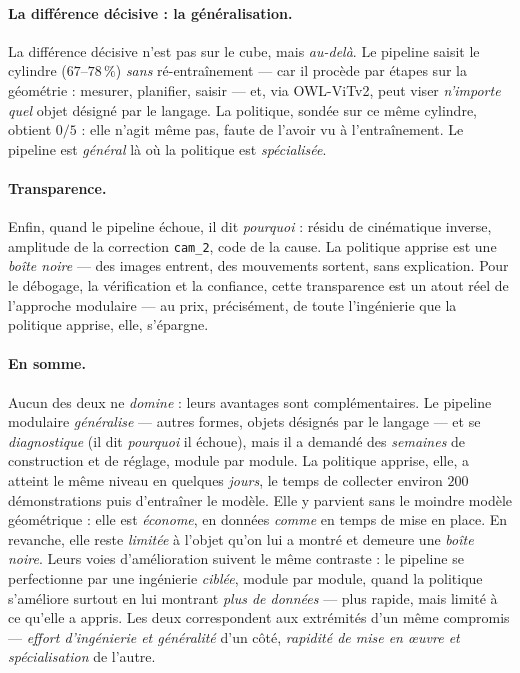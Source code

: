 \paragraph{La différence décisive : la généralisation.} La différence décisive n'est pas sur le cube, mais \emph{au-delà}. Le pipeline saisit le cylindre ($67$--$78\,\%$) \emph{sans} ré-entraînement --- car il procède par étapes sur la géométrie : mesurer, planifier, saisir --- et, via OWL-ViTv2, peut viser \emph{n'importe quel} objet désigné par le langage. La politique, sondée sur ce même cylindre, obtient $0/5$ : elle n'agit même pas, faute de l'avoir vu à l'entraînement. Le pipeline est \emph{général} là où la politique est \emph{spécialisée}.

\paragraph{Transparence.} Enfin, quand le pipeline échoue, il dit \emph{pourquoi} : résidu de cinématique inverse, amplitude de la correction \texttt{cam\_2}, code de la cause. La politique apprise est une \emph{boîte noire} --- des images entrent, des mouvements sortent, sans explication. Pour le débogage, la vérification et la confiance, cette transparence est un atout réel de l'approche modulaire --- au prix, précisément, de toute l'ingénierie que la politique apprise, elle, s'épargne.

\paragraph{En somme.} Aucun des deux ne \emph{domine} : leurs avantages sont complémentaires. Le pipeline modulaire \emph{généralise} --- autres formes, objets désignés par le langage --- et se \emph{diagnostique} (il dit \emph{pourquoi} il échoue), mais il a demandé des \emph{semaines} de construction et de réglage, module par module. La politique apprise, elle, a atteint le même niveau en quelques \emph{jours}, le temps de collecter environ $200$ démonstrations puis d'entraîner le modèle. Elle y parvient sans le moindre modèle géométrique : elle est \emph{économe}, en données \emph{comme} en temps de mise en place. En revanche, elle reste \emph{limitée} à l'objet qu'on lui a montré et demeure une \emph{boîte noire}. Leurs voies d'amélioration suivent le même contraste : le pipeline se perfectionne par une ingénierie \emph{ciblée}, module par module, quand la politique s'améliore surtout en lui montrant \emph{plus de données} --- plus rapide, mais limité à ce qu'elle a appris. Les deux correspondent aux extrémités d'un même compromis --- \emph{effort d'ingénierie et généralité} d'un côté, \emph{rapidité de mise en œuvre et spécialisation} de l'autre.

